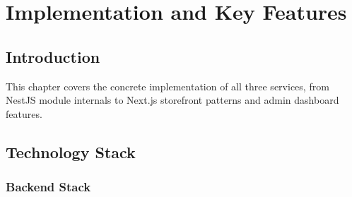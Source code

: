 
\chapter{Implementation and Key Features}

\section*{Introduction}
This chapter covers the concrete implementation of all three services, from
NestJS module internals to Next.js storefront patterns and admin dashboard features.

\section{Technology Stack}

\subsection{Backend Stack}

